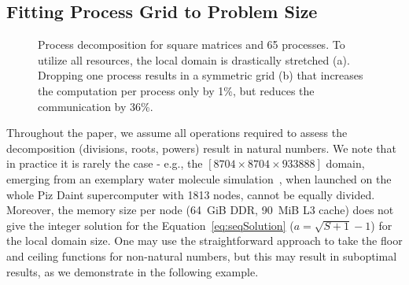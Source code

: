 \documentclass[sigplan,review,anonymous]{acmart}\settopmatter{printfolios=true,printccs=false,printacmref=false}
\begin{document}
\subsection{Fitting Process Grid to Problem Size}
\label{sec:decompArbitrary}
\begin{figure}[!tbp]
	\centering
	\hfill
	\caption{Process decomposition for square matrices and 65 
		processes. To utilize all resources, the local domain is 
		drastically stretched (a). Dropping one 
		process results in a symmetric grid (b) that 
		increases the computation per process only by 1\%, but reduces 
		the communication by 36\%.}
	\label{fig:decompProblem}
\end{figure}
Throughout the paper, we assume all operations required to 
assess the decomposition (divisions, roots, powers) result in natural 
numbers. We note that in practice it is rarely the case - e.g., the 
$[8704 \times 8704 \times 933888]$ domain, emerging from an exemplary 
water molecule simulation~\cite{joost}, when launched on the whole 
Piz Daint supercomputer with 1813 nodes, cannot be equally divided. 
Moreover, the memory size per 
node (64~GiB DDR, 90~MiB L3 cache) does not give the integer solution 
for the Equation~\ref{eq:seqSolution} ($a = \sqrt{S+1} -1$) for the 
local domain size. One may use the straightforward approach to take  
the floor and ceiling
functions for non-natural numbers, but this may result in suboptimal 
results, as we demonstrate in the following example.
\end{document}
